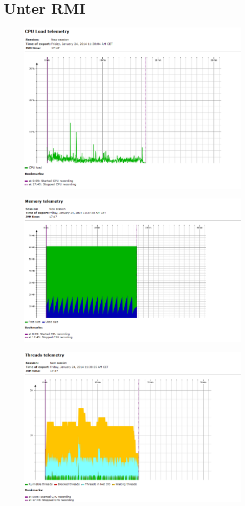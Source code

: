 \documentclass[a4paper,12pt]{scrreprt}
\begin{document}
	\section{Unter RMI}
\begin{figure}[h]
\centering
\includegraphics[width=0.7\linewidth]{./CPU_Load_Telemetry_RMI}
\caption{}
\label{fig:CPU_Load_Telemetry_RMI}
\end{figure}
\begin{figure}[h]
\centering
\includegraphics[width=0.7\linewidth]{./Memory_RMI}
\caption{}
\label{fig:Memory_RMI}
\end{figure}
\begin{figure}[h]
\centering
\includegraphics[width=0.7\linewidth]{./Thread_RMI}
\caption{}
\label{fig:Thread_RMI}
\end{figure}
\end{document}
